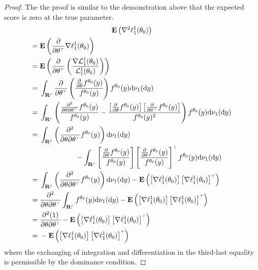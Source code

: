 \documentclass[11pt,letterpaper,reqno,oneside]{article}
\begin{document}
\begin{proof}
	The the proof is similar to the demonstration above that the expected score is zero at the true parameter.
	\begin{multline*}
		\mathbf{E}\left( \nabla^2 \ell^1_1(\theta_0) \right)
		\\
		\begin{aligned}
			={}& \mathbf{E}\left( \frac{\partial}{\partial \theta^{\scriptscriptstyle \top}}
			\nabla \ell^1_1(\theta_0) \right)
			\\
			={}& \mathbf{E}\left( \frac{\partial}{\partial \theta^{\scriptscriptstyle \top}}
			\left( \frac{ \nabla \mathcal{L}^1_1(\theta_0) }
			{ \mathcal{L}^1_1(\theta_0) } \right) \right)
			\\
			={}& \int_{\mathbf{R}^r} \frac{\partial}{\partial \theta^{\scriptscriptstyle \top}}
			\left( \frac{ \frac{\partial}{\partial \theta} f^{\theta_0}(y) }
			{ f^{\theta_0}(y) } \right)
			f^{\theta_0}(y) \mathrm{d} \nu_1(\mathrm{d} y)
			\\
			={}& \int_{\mathbf{R}^r} \left( 
			\frac{ \frac{\partial^2}{\partial \theta \partial \theta^{\scriptscriptstyle \top}} 
			f^{\theta_0}(y) }{ f^{\theta_0}(y) }
			-
			\frac{ 
			\left[ \frac{\partial}{\partial \theta} f^{\theta_0}(y) \right] 
			\left[ \frac{\partial}{\partial \theta^{\scriptscriptstyle \top}} f^{\theta_0}(y) \right]
			}{ f^{\theta_0}(y)^2 }
			\right)
			f^{\theta_0}(y) \mathrm{d} \nu_1(\mathrm{d} y)
			\\
			={}& \int_{\mathbf{R}^r} \left(
			\frac{ \partial^2}{\partial \theta \partial \theta^{\scriptscriptstyle \top}} 
			f^{\theta_0}(y) \right) 
			\mathrm{d} \nu_1(\mathrm{d} y)
			\\
			&\quad\quad\quad\quad\quad -
			\int_{\mathbf{R}^r}
			\left[ \frac{ \frac{\partial}{\partial \theta} f^{\theta_0}(y) }
			{ f^{\theta_0}(y) } \right]
			\left[ \frac{ \frac{\partial}{\partial \theta} f^{\theta_0}(y) }
			{ f^{\theta_0}(y) } \right]^{\scriptscriptstyle \top}
			f^{\theta_0}(y) \mathrm{d} \nu_1(\mathrm{d} y)
			\\
			={}& \int_{\mathbf{R}^r} \left(
			\frac{ \partial^2}{\partial \theta \partial \theta^{\scriptscriptstyle \top}} 
			f^{\theta_0}(y) \right) 
			\mathrm{d} \nu_1(\mathrm{d} y)
			-
			\mathbf{E}\left(
			\left[ \nabla \ell^1_1(\theta_0) \right]
			\left[ \nabla \ell^1_1(\theta_0) \right]^{\scriptscriptstyle \top}
			\right)
			\\
			={}& \frac{ \partial^2}{\partial \theta \partial \theta^{\scriptscriptstyle \top}} 
			\int_{\mathbf{R}^r} 
			f^{\theta_0}(y)
			\mathrm{d} \nu_1(\mathrm{d} y)
			-
			\mathbf{E}\left(
			\left[ \nabla \ell^1_1(\theta_0) \right]
			\left[ \nabla \ell^1_1(\theta_0) \right]^{\scriptscriptstyle \top}
			\right)
			\\
			={}& \frac{ \partial^2 (1)}{\partial \theta \partial \theta^{\scriptscriptstyle \top}} 
			-
			\mathbf{E}\left(
			\left[ \nabla \ell^1_1(\theta_0) \right]
			\left[ \nabla \ell^1_1(\theta_0) \right]^{\scriptscriptstyle \top}
			\right)
			\\
			={}& -
			\mathbf{E}\left(
			\left[ \nabla \ell^1_1(\theta_0) \right]
			\left[ \nabla \ell^1_1(\theta_0) \right]^{\scriptscriptstyle \top}
			\right) 
		\end{aligned}
	\end{multline*}
	where the exchanging of integration and differentiation in the third-last equality is permissible by the dominance condition.
\end{proof}
\end{document}
